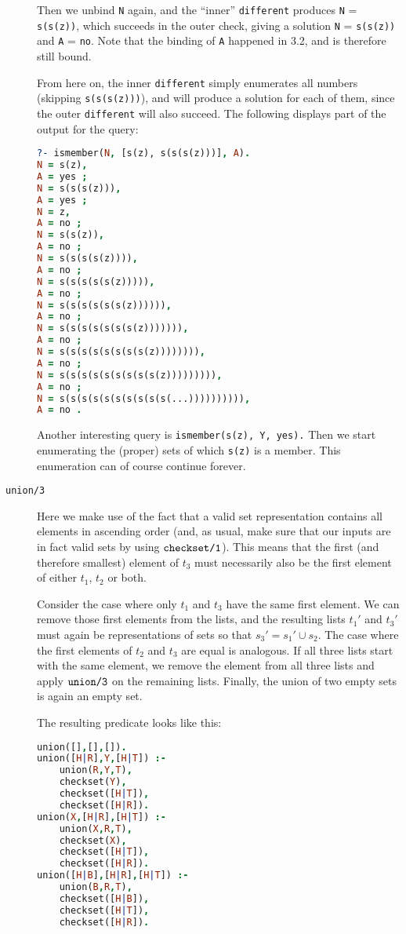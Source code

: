 \documentclass[a4paper]{article}
\newcommand{\pfunc}[1]{\textnormal{\texttt{#1}}\xspace}
\newcommand{\pfuncn}[2]{\textnormal{\texttt{#1/#2}}\xspace}
\newcommand{\plVar}[1]{\texttt{#1}\xspace}
\begin{document}
\begin{description}
Then we unbind \plVar{N} again, and the ``inner'' \pfunc{different} produces \plVar{N} = \plVar{s(s(z))}, which succeeds in the outer check, giving a solution \plVar{N} = \plVar{s(s(z))} and \plVar{A} = \plVar{no}. Note that the binding of \plVar{A} happened in 3.2, and is therefore still bound.

From here on, the inner \pfunc{different} simply enumerates all numbers (skipping \plVar{s(s(s(z)))}), and will produce a solution for each of them, since the outer \pfunc{different} will also succeed. The following displays part of the output for the query:

\begin{lstlisting}[language=prolog]
?- ismember(N, [s(z), s(s(s(z)))], A).
N = s(z),
A = yes ;
N = s(s(s(z))),
A = yes ;
N = z,
A = no ;
N = s(s(z)),
A = no ;
N = s(s(s(s(z)))),
A = no ;
N = s(s(s(s(s(z))))),
A = no ;
N = s(s(s(s(s(s(z)))))),
A = no ;
N = s(s(s(s(s(s(s(z))))))),
A = no ;
N = s(s(s(s(s(s(s(s(z)))))))),
A = no ;
N = s(s(s(s(s(s(s(s(s(z))))))))),
A = no ;
N = s(s(s(s(s(s(s(s(s(s(...)))))))))),
A = no .
\end{lstlisting}

Another interesting query is \texttt{ismember(s(z), Y, yes).} Then we start enumerating the (proper) sets of which \plVar{s(z)} is a member. This enumeration can of course continue forever. 

\item[\pfuncn{union}{3}] Here we make use of the fact that a valid set representation contains all elements in ascending order (and, as usual, make sure that our inputs are in fact valid sets by using $\pfuncn{checkset}{1}$). This means that the first (and therefore smallest) element of $t_3$ must necessarily also be the first element of either $t_1$, $t_2$ or both. 

Consider the case where only $t_1$ and $t_3$ have the same first element. We can remove those first elements from the lists, and the resulting lists $t_1'$ and $t_3'$ must again be representations of sets so that $s_3' = s_1' \cup s_2$. The case where the first elements of $t_2$ and $t_3$ are equal is analogous. If all three lists start with the same element, we remove the element from all three lists and apply $\pfuncn{union}{3}$ on the remaining lists. Finally, the union of two empty sets is again an empty set. 
  
  The resulting predicate looks like this:
  \begin{lstlisting}[language=prolog]
union([],[],[]).
union([H|R],Y,[H|T]) :- 
	union(R,Y,T),
	checkset(Y), 
	checkset([H|T]),
	checkset([H|R]).
union(X,[H|R],[H|T]) :- 
	union(X,R,T),
	checkset(X), 
	checkset([H|T]),
	checkset([H|R]).
union([H|B],[H|R],[H|T]) :- 
	union(B,R,T),
	checkset([H|B]), 
	checkset([H|T]),
	checkset([H|R]).
\end{lstlisting}


\end{description}
\end{document}
